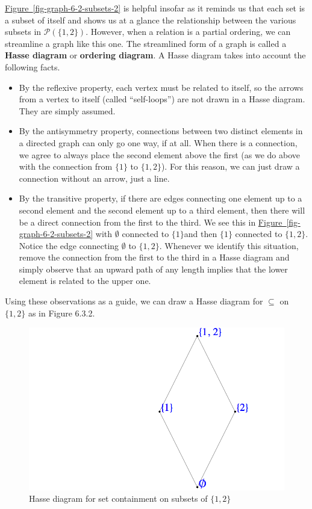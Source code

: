 \documentclass[10pt,]{book}
\newcommand{\terminology}[1]{\textbf{#1}}
\theoremstyle{plain}
\theoremstyle{definition}
\theoremstyle{definition}
\theoremstyle{definition}
\theoremstyle{definition}
\begin{document}
\par
\hyperref[fig-graph-6-2-subsets-2]{Figure~\ref{fig-graph-6-2-subsets-2}} is helpful insofar as it reminds us that each set is a subset of itself and shows us at a glance the relationship between the various subsets in \(\mathcal{P} (\{1,2\})\). However, when a relation is a partial ordering, we can streamline a graph like this one.  The streamlined
form of a graph is called a \terminology{Hasse diagram} or \terminology{ordering diagram}.  A Hasse diagram takes into account the following facts.%
\par
\leavevmode%
\begin{itemize}[label=\textbullet]
\item{} By the reflexive property, each vertex must be related to itself, so the arrows from a vertex to itself (called ``self-loops'') are
not drawn in a Hasse diagram. They are simply assumed.%
\item{}  By the antisymmetry property, connections between two distinct elements in a directed graph can only go one way, if at all.  When there
is a connection, we agree to always place the second element above the first (as we do above with the connection from \(\{1\}\) to \(\{1,2\}\)).
For this reason, we can just draw a connection without an arrow, just a line.%
\item{} By the transitive property, if there are edges connecting one element up to a second element and the second element up to a third element,
then there will be a direct connection from the first to the third. We see this in \hyperref[fig-graph-6-2-subsets-2]{Figure~\ref{fig-graph-6-2-subsets-2}} with \(\emptyset\) connected to \(\{1\}\)\(\)and
then \(\{1\}\) connected to \(\{1,2\}\). Notice the edge connecting \(\emptyset\) to \(\{1,2\}\).  Whenever we identify this situation, remove
the connection from the first to the third in a Hasse diagram and simply observe that an upward path of any length implies that the lower element
is related to the upper one.
%
\end{itemize}
%
\par
Using these observations as a guide, we can draw a Hasse diagram for \(\subseteq\) on \(\{1,2\}\) as in Figure 6.3.2.%
\leavevmode%
\begin{figure}
\centering
\includegraphics[width=1\linewidth]{images/subsets_2_hasse.png}
\caption{Hasse diagram for set containment on subsets of \(\{1,2\}\)
                \label{subsets_2_hasse}}
\end{figure}
\end{document}
